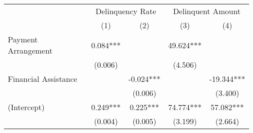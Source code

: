 \begin{tabular}{lcccc}
\toprule 
\midrule 
 & \multicolumn{2}{c}{Delinquency Rate} & \multicolumn{2}{c}{Delinquent Amount} \\
 \cmidrule(lr){2-3} \cmidrule(lr){4-5} 
 & (1) & (2) & (3) & (4) \\
\midrule 
Payment Arrangement & 0.084*** &  & 49.624*** &  \\
 & (0.006) &  & (4.506) &  \\
Financial Assistance &  & -0.024*** &  & -19.344*** \\
 &  & (0.006) &  & (3.400) \\
(Intercept) & 0.249*** & 0.225*** & 74.774*** & 57.082*** \\
 & (0.004) & (0.005) & (3.199) & (2.664) \\
\midrule 
\bottomrule 
\end{tabular}
